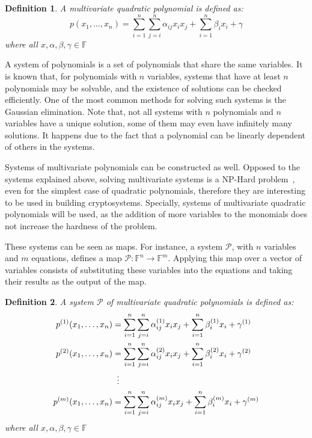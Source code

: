 \documentclass{ufsctex/ufsctex}
\newtheorem{definition}{Definition}
\begin{document}
\begin{definition}
A multivariate quadratic polynomial is defined as:
\begin{equation}
p(x_1,\dots,x_n) = \sum_{i=1}^n \sum_{j=i}^n \alpha_{ij} x_i x_j +
	\sum_{i=1}^n \beta_i x_i + \gamma
\end{equation}
where all $x, \alpha, \beta, \gamma \in \mathbb{F}$
\end{definition}

A system of polynomials is a set of polynomials that share the same variables.
It is known that, for polynomials with $n$ variables, systems that have at
least $n$ polynomials may be solvable, and the existence of solutions can be
checked efficiently. One of the most common methods for solving such systems is
the Gaussian elimination. Note that, not all systems with $n$ polynomials and
$n$ variables have a unique solution, some of them may even have infinitely
many solutions. It happens due to the fact that a polynomial can be linearly
dependent of others in the systems.

Systems of multivariate polynomials can be constructed as well. Opposed to the
systems explained above, solving multivariate systems is a NP-Hard
problem~\cite{garey1979npc}, even for the simplest case of quadratic
polynomials, therefore they are interesting to be used in building
cryptosystems. Specially, systems of multivariate quadratic polynomials will be
used, as the addition of more variables to the monomials does not increase the
hardness of the problem.

These systems can be seen as maps. For instance, a system $\mathcal{P}$, with
$n$ variables and $m$ equations, defines a map $\mathcal{P}:\mathbb{F}^n \to
\mathbb{F}^m$. Applying this map over a vector of variables consists of
substituting these variables into the equations and taking their results as the
output of the map.

\begin{definition}\label{def:mqsystem}
A system $\mathcal{P}$ of multivariate quadratic polynomials is defined as:
\begin{equation}\label{eq:mqsystem}
\begin{split}
p^{(1)}(x_1,\dots,x_n) &= \sum_{i=1}^n \sum_{j=i}^n \alpha^{(1)}_{ij} x_i x_j
	+ \sum_{i=1}^n \beta^{(1)}_i x_i + \gamma^{(1)} \\
p^{(2)}(x_1,\dots,x_n) &= \sum_{i=1}^n \sum_{j=i}^n \alpha^{(2)}_{ij} x_i x_j
	+ \sum_{i=1}^n \beta^{(2)}_i x_i + \gamma^{(2)} \\
&\vdotswithin{=} \\
p^{(m)}(x_1,\dots,x_n) &= \sum_{i=1}^n \sum_{j=i}^n \alpha^{(m)}_{ij} x_i x_j
	+ \sum_{i=1}^n \beta^{(m)}_i x_i + \gamma^{(m)}
\end{split}
\end{equation}
where all $x, \alpha, \beta, \gamma \in \mathbb{F}$
\end{definition}
\end{document}
